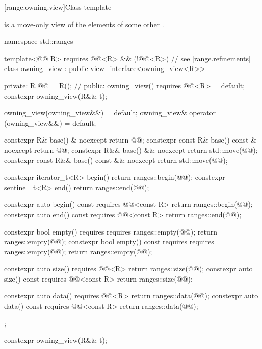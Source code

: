 [range.owning.view]{Class template }

\pnum
{} is a move-only view
of the elements of some other .
\begin{codeblock}
namespace std::ranges {
  template<@@ R>
    requires @@<R> && (!@@<R>) // see \ref{range.refinements}
  class owning_view : public view_interface<owning_view<R>> {
  private:
    R @@ = R();         // \expos
  public:
    owning_view() requires @@<R> = default;
    constexpr owning_view(R&& t);

    owning_view(owning_view&&) = default;
    owning_view& operator=(owning_view&&) = default;

    constexpr R& base() & noexcept { return @@; }
    constexpr const R& base() const & noexcept { return @@; }
    constexpr R&& base() && noexcept { return std::move(@@); }
    constexpr const R&& base() const && noexcept { return std::move(@@); }

    constexpr iterator_t<R> begin() { return ranges::begin(@@); }
    constexpr sentinel_t<R> end() { return ranges::end(@@); }

    constexpr auto begin() const requires @@<const R>
    { return ranges::begin(@@); }
    constexpr auto end() const requires @@<const R>
    { return ranges::end(@@); }

    constexpr bool empty() requires requires { ranges::empty(@@); }
    { return ranges::empty(@@); }
    constexpr bool empty() const requires requires { ranges::empty(@@); }
    { return ranges::empty(@@); }

    constexpr auto size() requires @@<R>
    { return ranges::size(@@); }
    constexpr auto size() const requires @@<const R>
    { return ranges::size(@@); }

    constexpr auto data() requires @@<R>
    { return ranges::data(@@); }
    constexpr auto data() const requires @@<const R>
    { return ranges::data(@@); }
  };
}
\end{codeblock}

\begin{itemdecl}
constexpr owning_view(R&& t);
\end{itemdecl}

